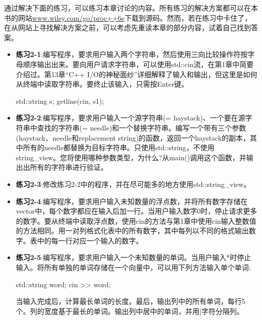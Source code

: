 
通过解决下面的练习，可以练习本章讨论的内容。所有练习的解决方案都可以在本书的网站\url{www.wiley.com/go/proc++6e}下载到源码。然而，若在练习中卡住了，在从网站上寻找解决方案之前，可以考虑先重读本章的部分内容，试着自己找到答案。

\begin{itemize}
\item
\textbf{练习2-1}:编写程序，要求用户输入两个字符串，然后使用三向比较操作符按字母顺序输出出来。要向用户请求字符串，可以使用std::cin流，在第1章中简要介绍过。第13章“C++ I/O的神秘面纱”详细解释了输入和输出，但这里是如何从终端中读取字符串。要终止该输入，只需按Enter键。

\begin{cpp}
std::string s;
getline(cin, s1);
\end{cpp}

\item
\textbf{练习2-2}:编写程序，要求用户输入一个源字符串(= haystack)、一个要在源字符串中查找的字符串(= needle)和一个替换字符串。编写一个带有三个参数(haystack、needle和replacement string)的函数，返回一个haystack的副本，其中所有的needle都替换为目标字符串。只使用std::string，不使用string\_view。您将使用哪种参数类型，为什么?从main()调用这个函数，并输出出所有的字符串进行验证。

\item
\textbf{练习2-3}:修改练习2-2中的程序，并在尽可能多的地方使用std::string\_view。

\item
\textbf{练习2-4}:编写程序，要求用户输入未知数量的浮点数，并将所有数字存储在vector中，每个数字都应在输入后加一行。当用户输入数字0时，停止请求更多的数字。要从终端中读取浮点数，使用cin的方法与第1章中使用cin输入整数值的方法相同。用一对列格式化表中的所有数字，其中每列以不同的格式输出数字。表中的每一行对应一个输入的数字。

\item
\textbf{练习2-5}:编写程序，要求用户输入一个未知数量的单词。当用户输入*时停止输入。将所有单独的单词存储在一个向量中，可以用下列方法输入单个单词:

\begin{cpp}
std::string word;
cin >> word;
\end{cpp}

当输入完成后，计算最长单词的长度。最后，输出列中的所有单词，每行5个。列的宽度基于最长的单词。输出列中居中的单词，并用|字符分隔列。
\end{itemize}


